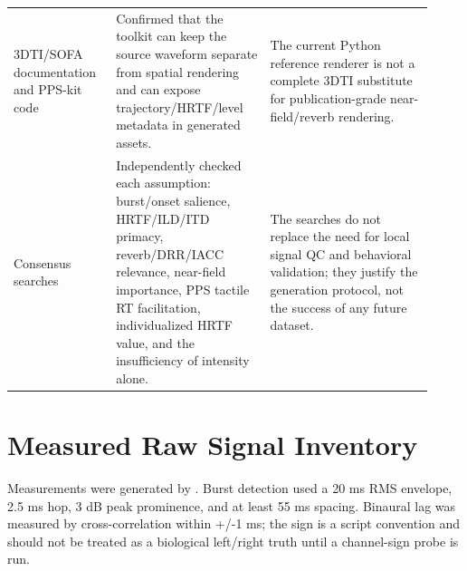 \documentclass[10pt]{article}
\begin{document}
\begin{longtable}{P{0.22\linewidth} P{0.34\linewidth} P{0.36\linewidth}}
3DTI/SOFA documentation and PPS-kit code & Confirmed that the toolkit can keep the source waveform separate from spatial rendering and can expose trajectory/HRTF/level metadata in generated assets. & The current Python reference renderer is not a complete 3DTI substitute for publication-grade near-field/reverb rendering.\\
Consensus searches & Independently checked each assumption: burst/onset salience, HRTF/ILD/ITD primacy, reverb/DRR/IACC relevance, near-field importance, PPS tactile RT facilitation, individualized HRTF value, and the insufficiency of intensity alone. & The searches do not replace the need for local signal QC and behavioral validation; they justify the generation protocol, not the success of any future dataset.\\
\bottomrule
\end{longtable}



\section*{Measured Raw Signal Inventory}

Measurements were generated by . Burst detection used a 20 ms RMS envelope, 2.5 ms hop, 3 dB peak prominence, and at least 55 ms spacing. Binaural lag was measured by cross-correlation within +/-1 ms; the sign is a script convention and should not be treated as a biological left/right truth until a channel-sign probe is run.
\end{document}
